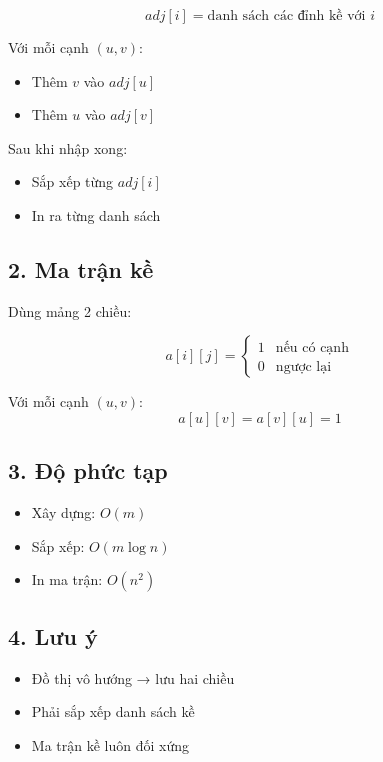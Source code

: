 \documentclass[a4paper,12pt]{article}
\begin{document}
\[
adj[i] = \text{danh sách các đỉnh kề với } i
\]

Với mỗi cạnh $(u, v)$:
\begin{itemize}
    \item Thêm $v$ vào $adj[u]$
    \item Thêm $u$ vào $adj[v]$
\end{itemize}

Sau khi nhập xong:
\begin{itemize}
    \item Sắp xếp từng $adj[i]$
    \item In ra từng danh sách
\end{itemize}

\subsection*{2. Ma trận kề}

Dùng mảng 2 chiều:

\[
a[i][j] =
\begin{cases}
1 & \text{nếu có cạnh} \\
0 & \text{ngược lại}
\end{cases}
\]

Với mỗi cạnh $(u, v)$:
\[
a[u][v] = a[v][u] = 1
\]

\subsection*{3. Độ phức tạp}

\begin{itemize}
    \item Xây dựng: $O(m)$
    \item Sắp xếp: $O(m \log n)$
    \item In ma trận: $O(n^2)$
\end{itemize}

\subsection*{4. Lưu ý}

\begin{itemize}
    \item Đồ thị vô hướng → lưu hai chiều
    \item Phải sắp xếp danh sách kề
    \item Ma trận kề luôn đối xứng
\end{itemize}
\end{document}
